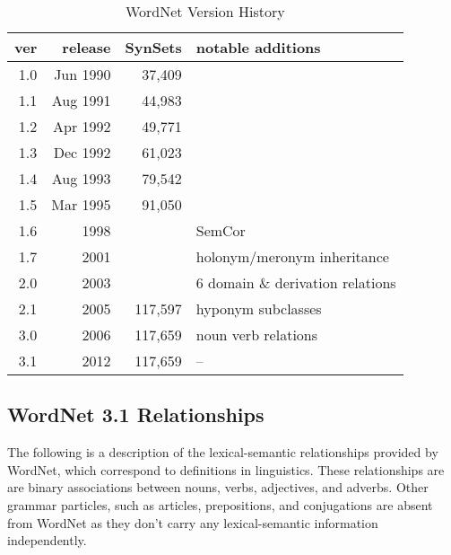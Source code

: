 
\begin{table}[]
\centering
\begin{tabular}{|r|r|r|l|}
\hline
ver & release & SynSets & notable additions \\
\hline
1.0 & Jun 1990 & 37,409 &  \\
1.1 & Aug 1991 & 44,983 &  \\
1.2 & Apr 1992 & 49,771 &  \\
1.3 & Dec 1992 & 61,023 &  \\
1.4 & Aug 1993 & 79,542 &  \\
1.5 & Mar 1995 & 91,050 &  \\ %
1.6 & 1998 &  & SemCor  \cite{semcor}\\
1.7 & 2001 &  & holonym/meronym inheritance \\ %
2.0 & 2003 &  & 6 domain \& derivation relations \\ %
2.1 & 2005 & 117,597 & hyponym subclasses \\ %
3.0 & 2006 & 117,659 & noun verb relations \\ %
3.1 & 2012 & 117,659 & -- \\
\hline
\end{tabular}
\caption{WordNet Version History}
\label{wordnet-history}
\end{table}

\subsection{WordNet 3.1 Relationships}
The following is a description of the lexical-semantic relationships provided by WordNet, which correspond to definitions in linguistics. These relationships are are binary associations between nouns, verbs, adjectives, and adverbs. Other grammar particles, such as articles, prepositions, and conjugations are absent from WordNet as they don't carry any lexical-semantic information independently.

